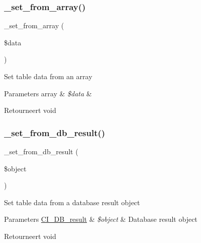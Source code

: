 \subsubsection{\texorpdfstring{\_set\_from\_array()}{\_set\_from\_array()}}
{\footnotesize\ttfamily \+\_\+set\+\_\+from\+\_\+array (\begin{DoxyParamCaption}\item[{}]{\$data }\end{DoxyParamCaption})\hspace{0.3cm}{\ttfamily [protected]}}

Set table data from an array


\begin{DoxyParams}[1]{Parameters}
array & {\em \$data} & \\
\hline
\end{DoxyParams}
\begin{DoxyReturn}{Retourneert}
void 
\end{DoxyReturn}
\mbox{\label{class_c_i___table_a76d76f4f5ffe03c119b95164dcebf9ed}} 
\subsubsection{\texorpdfstring{\_set\_from\_db\_result()}{\_set\_from\_db\_result()}}
{\footnotesize\ttfamily \+\_\+set\+\_\+from\+\_\+db\+\_\+result (\begin{DoxyParamCaption}\item[{}]{\$object }\end{DoxyParamCaption})\hspace{0.3cm}{\ttfamily [protected]}}

Set table data from a database result object


\begin{DoxyParams}[1]{Parameters}
\mbox{\hyperlink{class_c_i___d_b__result}{C\+I\+\_\+\+D\+B\+\_\+result}} & {\em \$object} & Database result object \\
\hline
\end{DoxyParams}
\begin{DoxyReturn}{Retourneert}
void 
\end{DoxyReturn}
\mbox{\label{class_c_i___table_aed032b02068e33116d9ecf9a0eedbbbe}} 
